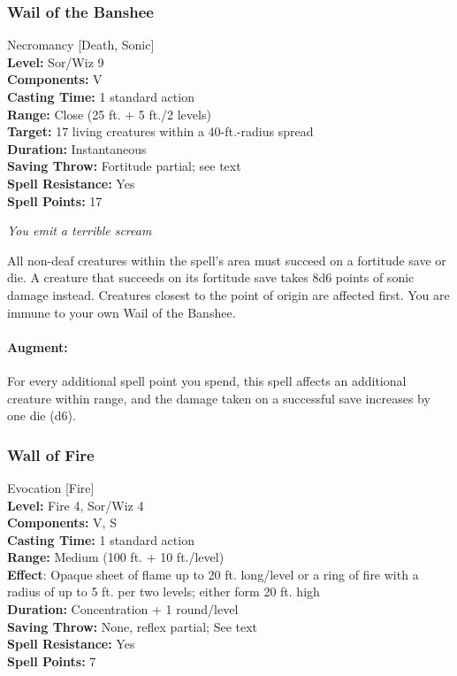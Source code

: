 \subsubsection{Wail of the Banshee}
\label{Spell:WailOfTheBanshee}
Necromancy [Death, Sonic]
\\ \textbf{Level:} Sor/Wiz 9
\\ \textbf{Components:} V
\\ \textbf{Casting Time:} 1 standard action
\\ \textbf{Range:} Close (25 ft. + 5 ft./2 levels)
\\ \textbf{Target:} 17 living creatures within a 40-ft.-radius spread
\\ \textbf{Duration:} Instantaneous
\\ \textbf{Saving Throw:} Fortitude partial; see text
\\ \textbf{Spell Resistance:} Yes
\\ \textbf{Spell Points:} 17

\emph{You emit a terrible scream} 

All non-deaf creatures within the spell's area must succeed on a fortitude save or die. A creature that succeeds on its fortitude save takes 8d6 points of sonic damage instead. Creatures closest to the point of origin are affected first. You are immune to your own Wail of the Banshee.

\paragraph{Augment:} For every additional spell point you spend, this spell affects an additional creature within range, 
and the damage taken on a successful save increases by one die (d6).
\subsubsection{Wall of Fire}
\label{Spell:WallOfFire}
Evocation [Fire]
\\ \textbf{Level:} Fire 4, Sor/Wiz 4
\\ \textbf{Components:} V, S
\\ \textbf{Casting Time:} 1 standard action
\\ \textbf{Range:} Medium (100 ft. + 10 ft./level)
\\ \textbf{Effect}: Opaque sheet of flame up to 20 ft. long/level or a ring of fire with a radius of up to 5 ft. per two levels; either form 20 ft. high
\\ \textbf{Duration:} Concentration + 1 round/level
\\ \textbf{Saving Throw:} None, reflex partial; See text
\\ \textbf{Spell Resistance:} Yes
\\ \textbf{Spell Points:} 7

